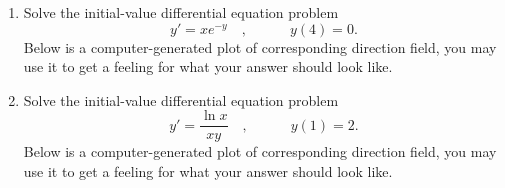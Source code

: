 \begin{enumerate}
\item Solve the initial-value differential equation problem 
\[
y'=xe^{-y} 
\quad,\quad  \quad \quad y(4)=0.
\]
Below is a computer-generated plot of corresponding direction field, you may use it to get a feeling for what your answer should look like.


\item Solve the initial-value differential equation problem 
\[
y'=\frac{\ln x}{x y}
\quad,\quad  \quad \quad y(1)=2.
\]
Below is a computer-generated plot of corresponding direction field, you may use it to get a feeling for what your answer should look like.

\end{enumerate}
